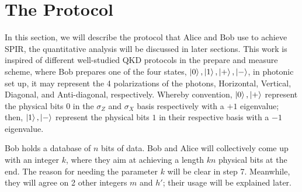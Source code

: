 \documentclass[%
 reprint,
superscriptaddress,
 amsmath,amssymb,
 aps,
]{revtex4-2}
\begin{document}
\section{The Protocol}
\label{sec:the_protocol}
In this section, we will describe the protocol that Alice and Bob use to achieve SPIR, the quantitative analysis will be discussed in later sections. This work is inspired of different well-studied QKD protocols in the prepare and measure scheme, where Bob prepares one of the four states, $\ket{0}, \ket{1}, \ket{+}, \ket{-}$, in photonic set up, it may represent the 4 polarizations of the photons, Horizontal, Vertical, Diagonal, and Anti-diagonal, respectively. Whereby convention, $\ket{0}, \ket{+}$ represent the physical bits $0$ in the $\sigma_Z$ and $\sigma_X$ basis respectively with a $+1$ eigenvalue; then, $\ket{1}, \ket{-}$ represent the physical bits $1$ in their respective basis with a $-1$ eigenvalue.

Bob holds a database of $n$ bits of data. Bob and Alice will collectively come up with an integer $k$, where they aim at achieving a length $kn$ physical bits at the end. The reason for needing the parameter $k$ will be clear in step 7. Meanwhile, they will agree on 2 other integers $m$ and $h'$; their usage will be explained later. 
\end{document}
